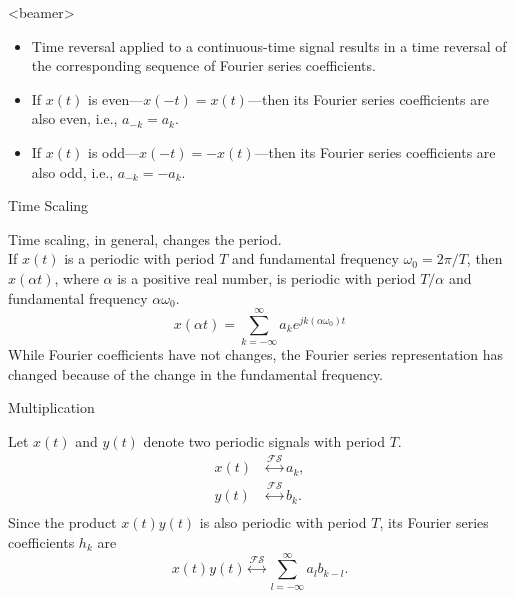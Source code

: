 \begin{frame}<beamer>
    \begin{itemize}[<+->]
      \item Time reversal applied to a continuous-time signal results in a time reversal of the corresponding sequence of Fourier series coefficients.
      \item If $x(t)$ is even---$x(-t) = x(t)$---then its Fourier series coefficients are also even, i.e., $a_{-k}=a_k$.
      \item If $x(t)$ is odd---$x(-t) = -x(t)$---then its Fourier series coefficients are also odd, i.e., $a_{-k}=-a_k$.
    \end{itemize}
\end{frame}


\begin{frame}[plain]{Time Scaling}
    {
        Time scaling, in general, changes the period.\\
        If $x(t)$ is a periodic with period $T$ and fundamental frequency $\omega_0 = 2\pi/T$, then $x(\alpha t)$, where $\alpha$ is a positive real number, is periodic with period $T/\alpha$ and fundamental frequency $\alpha \omega_0$.
        \begin{equation}
            x(\alpha t) = \sum_{k=-\infty}^{\infty} a_k e^{jk(\alpha \omega_0)t}
        \end{equation}
        While Fourier coefficients have not changes, the Fourier series representation \alert{has} changed because of the change in the fundamental frequency.

    }
\end{frame}


\begin{frame}[plain]{Multiplication}
    {
        Let $x(t)$ and $y(t)$ denote two periodic signals with period $T$.
        \begin{align*}
            x(t) &\overset{\mathcal{FS}}{\longleftrightarrow} a_k,\\
            y(t) &\overset{\mathcal{FS}}{\longleftrightarrow} b_k.\\
        \end{align*}
        Since the product $x(t)y(t)$ is also periodic with period $T$, its Fourier series coefficients $h_k$ are
        \begin{equation}
            x(t)y(t) \overset{\mathcal{FS}}{\longleftrightarrow} \sum_{l=-\infty}^{\infty}a_l b_{k-l}.
        \end{equation}

    }
\end{frame}



